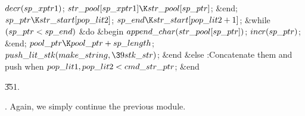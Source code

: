 $\\{decr}(\\{sp\_xptr1})$;\5
$\\{str\_pool}[\\{sp\_xptr1}]\K\\{str\_pool}[\\{sp\_ptr}]$;\6
\&{end};\2\6
$\\{sp\_ptr}\K\\{str\_start}[\\{pop\_lit2}]$;\5
$\\{sp\_end}\K\\{str\_start}[\\{pop\_lit2}+1]$;\6
\&{while} $(\\{sp\_ptr}<\\{sp\_end})$ \1\&{do}\6
\&{begin} $\\{append\_char}(\\{str\_pool}[\\{sp\_ptr}])$;\5
$\\{incr}(\\{sp\_ptr})$;\6
\&{end};\2\6
$\\{pool\_ptr}\K\\{pool\_ptr}+\\{sp\_length}$;\5
$\\{push\_lit\_stk}(\\{make\_string},\39\\{stk\_str})$;\6
\&{end}\6
\4\&{else} :Concatenate them and push when $\\{pop\_lit1},\\{pop%
\_lit2}<\\{cmd\_str\_ptr}$\X;\6
\&{end}\par
\U351.\fi

.
Again, we simply continue the previous module.

